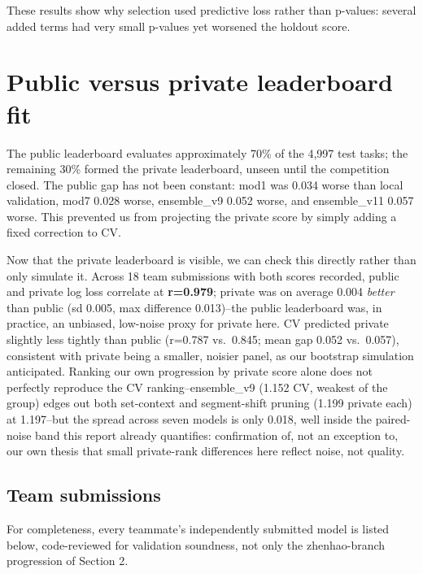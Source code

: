 \documentclass[
  9.5pt,
]{article}
\begin{document}
These results show why selection used predictive loss rather than
p-values: several added terms had very small p-values yet worsened the
holdout score.

\section{Public versus private leaderboard
fit}\label{public-versus-private-leaderboard-fit}

The public leaderboard evaluates approximately 70\% of the 4,997 test
tasks; the remaining 30\% formed the private leaderboard, unseen until
the competition closed. The public gap has not been constant: mod1 was
0.034 worse than local validation, mod7 0.028 worse, ensemble\_v9 0.052
worse, and ensemble\_v11 0.057 worse. This prevented us from projecting
the private score by simply adding a fixed correction to CV.

Now that the private leaderboard is visible, we can check this directly
rather than only simulate it. Across 18 team submissions with both
scores recorded, public and private log loss correlate at
\textbf{r=0.979}; private was on average 0.004 \emph{better} than public
(sd 0.005, max difference 0.013)--the public leaderboard was, in
practice, an unbiased, low-noise proxy for private here. CV predicted
private slightly less tightly than public (r=0.787 vs.~0.845; mean gap
0.052 vs.~0.057), consistent with private being a smaller, noisier
panel, as our bootstrap simulation anticipated. Ranking our own
progression by private score alone does not perfectly reproduce the CV
ranking--ensemble\_v9 (1.152 CV, weakest of the group) edges out both
set-context and segment-shift pruning (1.199 private each) at 1.197--but
the spread across seven models is only 0.018, well inside the
paired-noise band this report already quantifies: confirmation of, not
an exception to, our own thesis that small private-rank differences here
reflect noise, not quality.

\subsection{Team submissions}\label{team-submissions}

For completeness, every teammate's independently submitted model is
listed below, code-reviewed for validation soundness, not only the
zhenhao-branch progression of Section 2.
\end{document}
